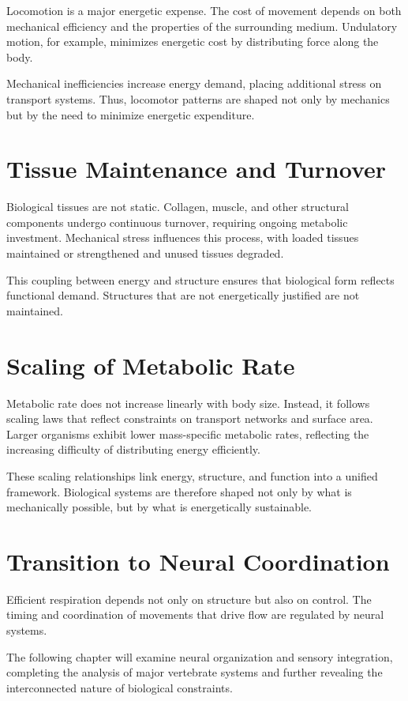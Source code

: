 \documentclass[11pt,oneside]{book}
\begin{document}
Locomotion is a major energetic expense. The cost of movement depends on both mechanical efficiency and the properties of the surrounding medium. Undulatory motion, for example, minimizes energetic cost by distributing force along the body.

Mechanical inefficiencies increase energy demand, placing additional stress on transport systems. Thus, locomotor patterns are shaped not only by mechanics but by the need to minimize energetic expenditure.

\section{Tissue Maintenance and Turnover}

Biological tissues are not static. Collagen, muscle, and other structural components undergo continuous turnover, requiring ongoing metabolic investment. Mechanical stress influences this process, with loaded tissues maintained or strengthened and unused tissues degraded.

This coupling between energy and structure ensures that biological form reflects functional demand. Structures that are not energetically justified are not maintained.

\section{Scaling of Metabolic Rate}

Metabolic rate does not increase linearly with body size. Instead, it follows scaling laws that reflect constraints on transport networks and surface area. Larger organisms exhibit lower mass-specific metabolic rates, reflecting the increasing difficulty of distributing energy efficiently.

These scaling relationships link energy, structure, and function into a unified framework. Biological systems are therefore shaped not only by what is mechanically possible, but by what is energetically sustainable.


\section{Transition to Neural Coordination}

Efficient respiration depends not only on structure but also on control. The timing and coordination of movements that drive flow are regulated by neural systems.

The following chapter will examine neural organization and sensory integration, completing the analysis of major vertebrate systems and further revealing the interconnected nature of biological constraints.
\end{document}
